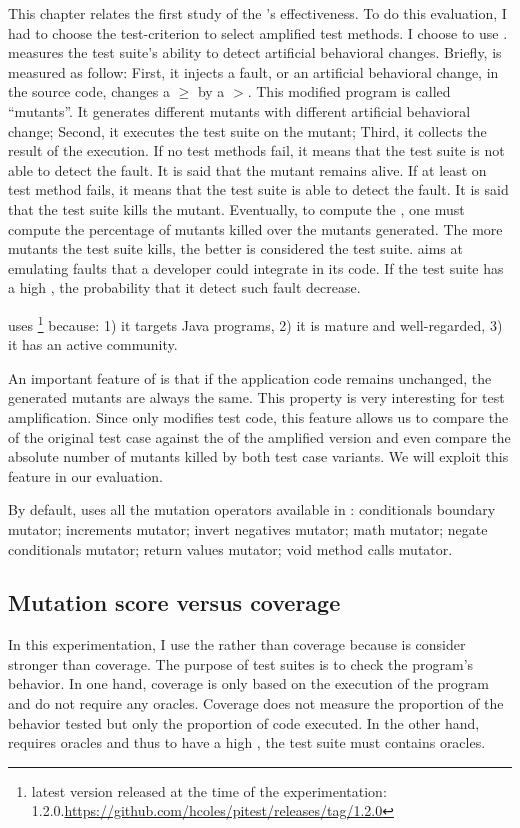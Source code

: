 This chapter relates the first study of the \dspot's effectiveness.
To do this evaluation, I had to choose the test-criterion to select amplified test methods.
I choose to use \ms.
\ms measures the test suite's ability to detect artificial behavioral changes.
Briefly, \ms is measured as follow:
First, it injects a fault, or an artificial behavioral change, in the source code, \eg changes a $\ge$ by a $>$.
This modified program is called ``mutants''.
It generates different mutants with different artificial behavioral change;
Second, it executes the test suite on the mutant;
Third, it collects the result of the execution.
If no test methods fail, it means that the test suite is not able to detect the fault. 
It is said that the mutant remains alive.
If at least on test method fails, it means that the test suite is able to detect the fault.
It is said that the test suite kills the mutant.
Eventually, to compute the \ms, one must compute the percentage of mutants killed over the mutants generated.
The more mutants the test suite kills, the better is considered the test suite.
\ms aims at emulating faults that a developer could integrate in its code.
If the test suite has a high \ms, the probability that it detect such fault decrease.

\dspot uses \pitest \footnote{latest version released at the time of the experimentation: 1.2.0.\url{https://github.com/hcoles/pitest/releases/tag/1.2.0}} because:
1) it targets Java programs, 
2) it is mature and well-regarded,
3) it has an active community. 

An important feature of \pitest is that if the application code remains unchanged, the generated mutants are always the same.
This property is very interesting for test amplification.
Since \dspot only modifies  test code, this feature allows us to compare the \ms of the original test case against the \ms of the amplified version and even compare the absolute number of mutants killed by both test case variants. 
We will exploit this feature in our evaluation.

By default, \dspot uses all the mutation operators available in \pitest: 
conditionals boundary mutator;
increments mutator;
invert negatives mutator;
math mutator;
negate conditionals mutator;
return values mutator;
void method calls mutator.

\subsection{Mutation score versus coverage}
\label{subsec:test-improvement:introduction:mutation-score-vs-coverage}
In this experimentation, I use the \ms rather than coverage because \ms is consider stronger than coverage.
The purpose of test suites is to check the program's behavior.
In one hand, coverage is only based on the execution of the program and do not require any oracles.
Coverage does not measure the proportion of the behavior tested but only the proportion of code executed.
In the other hand, \ms requires oracles and thus to have a high \ms, the test suite must contains oracles.

